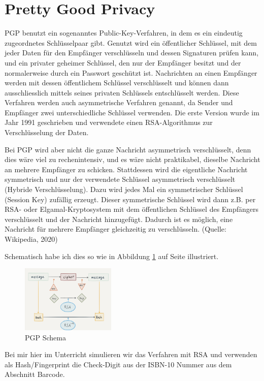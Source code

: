 \documentclass[%
<<<<<<< Updated upstream
11pt,%
twoside,%
titlepage,%
german,%
headsepline%
]{scrartcl}
\begin{document}
\clearpage

\section{Pretty Good Privacy}

PGP
benutzt ein sogenanntes Public-Key-Verfahren, in dem es ein eindeutig zugeordnetes Schlüsselpaar gibt. Genutzt wird ein öffentlicher Schlüssel, mit dem jeder Daten für den Empfänger verschlüsseln und dessen Signaturen prüfen kann, und ein privater geheimer Schlüssel, den nur der Empfänger besitzt und der normalerweise durch ein Passwort geschützt ist. Nachrichten an einen Empfänger werden mit dessen öffentlichem Schlüssel verschlüsselt und können dann ausschliesslich mittels seines privaten Schlüssels entschlüsselt werden. Diese Verfahren werden auch asymmetrische Verfahren genannt, da Sender und Empfänger zwei unterschiedliche Schlüssel verwenden. Die erste Version wurde im Jahr 1991 geschrieben und verwendete einen RSA-Al\-go\-rith\-mus zur Verschlüsselung der Daten.

Bei PGP wird aber nicht die ganze Nachricht asymmetrisch verschlüsselt, denn dies wäre viel zu rechenintensiv, und es wäre nicht praktikabel, dieselbe Nachricht an mehrere Empfänger zu schicken. Stattdessen wird die eigentliche Nachricht symmetrisch und nur der verwendete Schlüssel asymmetrisch verschlüsselt (Hybride Verschlüsselung). Dazu wird jedes Mal ein symmetrischer Schlüssel (Session Key) zufällig erzeugt. Dieser symmetrische Schlüssel wird dann z.B. per RSA- oder Elgamal-Kryptosystem mit dem öffentlichen Schlüssel des Empfängers verschlüsselt und der Nachricht hinzugefügt. Dadurch ist es möglich, eine Nachricht für mehrere Empfänger gleichzeitig zu verschlüsseln.
\hfill(Quelle: Wikipedia, 2020)

Schematisch habe ich dies so wie in Abbildung \ref{fig:pgp} auf Seite \pageref{fig:pgp} illustriert.
\begin{figure}
    \centering
    \includegraphics[width=0.4\textwidth]{pictures/pgpscheme.jpeg}
    \caption{PGP Schema}
    \label{fig:pgp}
\end{figure}
Bei mir hier im Unterricht simulieren wir das Verfahren mit RSA und verwenden als Hash/Fingerprint die Check-Digit aus der ISBN-10 Nummer aus dem Abschnitt Barcode.
\end{document}
